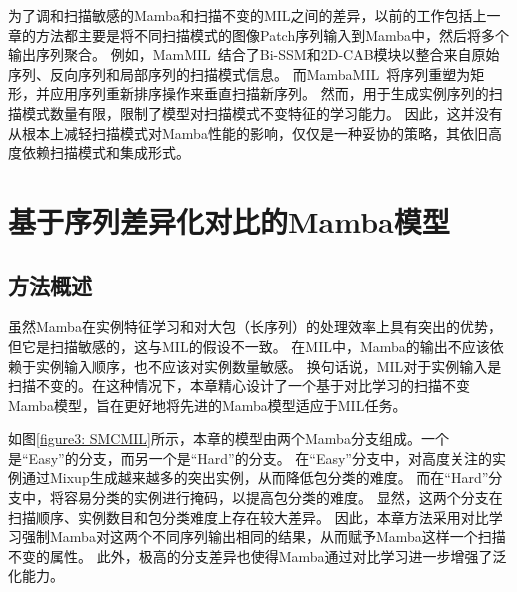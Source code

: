 为了调和扫描敏感的Mamba和扫描不变的MIL之间的差异，以前的工作包括上一章的方法都主要是将不同扫描模式的图像Patch序列输入到Mamba中，然后将多个输出序列聚合。
例如，MamMIL~\cite{fang2024mammil}结合了Bi-SSM和2D-CAB模块以整合来自原始序列、反向序列和局部序列的扫描模式信息。
而MambaMIL~\cite{yang2024mambamil}将序列重塑为矩形，并应用序列重新排序操作来垂直扫描新序列。
然而，用于生成实例序列的扫描模式数量有限，限制了模型对扫描模式不变特征的学习能力。
因此，这并没有从根本上减轻扫描模式对Mamba性能的影响，仅仅是一种妥协的策略，其依旧高度依赖扫描模式和集成形式。


\section[\hspace{-2pt}基于序列差异化对比的Mamba模型]{{\heiti{} \hspace{-8pt}基于序列差异化对比的Mamba模型}}\label{section4: 基于序列差异化对比的Mamba模型}

\subsection[\hspace{-2pt}方法概述]{{\heiti{} \hspace{-8pt}方法概述}}\label{section4: 方法概述}

虽然Mamba在实例特征学习和对大包（长序列）的处理效率上具有突出的优势，但它是扫描敏感的，这与MIL的假设不一致。
在MIL中，Mamba的输出不应该依赖于实例输入顺序，也不应该对实例数量敏感。
换句话说，MIL对于实例输入是扫描不变的。在这种情况下，本章精心设计了一个基于对比学习的扫描不变Mamba模型，旨在更好地将先进的Mamba模型适应于MIL任务。

如图\ref{figure3: SMCMIL}所示，本章的模型由两个Mamba分支组成。一个是“Easy”的分支，而另一个是“Hard”的分支。
在“Easy”分支中，对高度关注的实例通过Mixup生成越来越多的突出实例，从而降低包分类的难度。
而在“Hard”分支中，将容易分类的实例进行掩码，以提高包分类的难度。
显然，这两个分支在扫描顺序、实例数目和包分类难度上存在较大差异。
因此，本章方法采用对比学习强制Mamba对这两个不同序列输出相同的结果，从而赋予Mamba这样一个扫描不变的属性。
此外，极高的分支差异也使得Mamba通过对比学习进一步增强了泛化能力。

